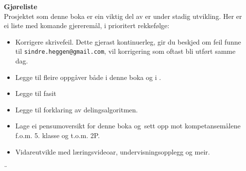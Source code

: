 \newpage
\textbf{Gjøreliste} \\
Prosjektet som denne boka er ein viktig del av er under stadig utvikling. Her er ei liste med komande gjereremål, i prioritert rekkefølge:
\begin{itemize}
	\item Korrigere skrivefeil. Dette gjerast kontinuerleg, gir du beskjed om feil funne til {\tt sindre.heggen@gmail.com}, vil korrigering som oftast bli utført samme dag.
	\item Legge til fleire oppgåver både i denne boka og i \mb. 
	\item Legge til fasit 
	\item Legge til forklaring av delingsalgoritmen.
	\item Lage ei pensumoversikt for denne boka og \mb\,sett opp mot kompetansemålene f.o.m. 5. klasse og t.o.m. 2P.
	\item Vidareutvikle  med læringsvideoar, undervisningsopplegg og meir. 
\end{itemize}¨
\newpage

